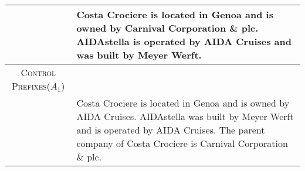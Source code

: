 \documentclass[11pt]{article}
\newcommand{\control}{\textsc{Control Prefixes}\xspace}
\newcommand{\rd}[1]{{\color{red}  #1}}
\begin{document}
\begin{table*}[bth!]
\begin{tabular}{c|p{}}
& Costa Crociere is located in Genoa and is owned by Carnival Corporation \& plc. AIDAstella is operated by AIDA Cruises and was built by Meyer Werft. \\\hline
\control ($A_{1}$) \\& Costa Crociere is located in Genoa and is owned by AIDA Cruises. AIDAstella was built by Meyer Werft and is operated by AIDA Cruises. The parent company of Costa Crociere is Carnival Corporation \& plc.
\\ \midrule 
\hline




  \end{tabular}
  \caption{\textbf{WebNLG example generations:} sources are shown in their linearized form, as fed to the T5-large based models, with prefix-tuning output and one of the gold references shown for comparison with \control output. Triplesets are from WebNLG unseen categories and the zero-shot procedure is depicted using the textual category labels. As an example, for the unseen category \emph{Athlete}, the closest Glove embedding belonging to a \emph{seen} category label in embedding space is \rd{SportsTeam}. Therefore the trained control prefix relating to \emph{SportsTeam} is used for this example at inference time.}
  \label{tab:app_web_qual}
\end{table*}
\end{document}
